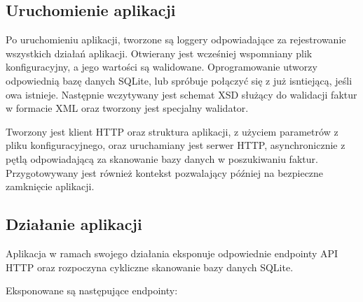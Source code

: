 \subsection{Uruchomienie aplikacji}
Po uruchomieniu aplikacji, tworzone są loggery odpowiadające za rejestrowanie wszystkich działań aplikacji. Otwierany jest wcześniej wspomniany plik konfiguracyjny, a jego wartości są walidowane. Oprogramowanie utworzy odpowiednią bazę danych SQLite, lub spróbuje połączyć się z już isntiejącą, jeśli owa istnieje. Następnie wczytywany jest schemat XSD służący do walidacji faktur w formacie XML oraz tworzony jest specjalny walidator.

Tworzony jest klient HTTP oraz struktura aplikacji, z użyciem parametrów z pliku konfiguracyjnego, oraz uruchamiany jest serwer HTTP, asynchronicznie z pętlą odpowiadającą za skanowanie bazy danych w poszukiwaniu faktur. Przygotowywany jest również kontekst pozwalający później na bezpieczne zamknięcie aplikacji. 

\subsection{Działanie aplikacji}
Aplikacja w ramach swojego działania eksponuje odpowiednie endpointy API HTTP oraz rozpoczyna cykliczne skanowanie bazy danych SQLite.

\noindent Eksponowane są następujące endpointy:

